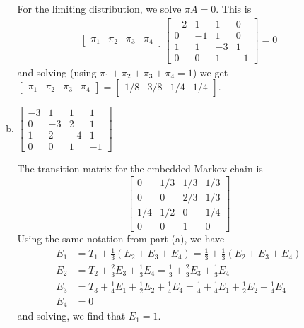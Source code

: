 \documentclass{article}
\begin{document}
\begin{itemize}
\begin{enumerate}[(a)]
\begin{soln}
					For the limiting distribution, we solve $\pi A = 0.$ This is
					\begin{align*}
						\begin{bmatrix}
							\pi_1 & \pi_2 & \pi_3 & \pi_4
						\end{bmatrix} \begin{bmatrix}
							-2 & 1 & 1 & 0 \\
							0 & -1 & 1 & 0 \\
							1 & 1 & -3 & 1 \\
							0 & 0 & 1 & -1
						\end{bmatrix} = 0
					\end{align*}
					and solving (using $\pi_1+\pi_2+\pi_3+\pi_4 = 1$) we get $\begin{bmatrix}
						\pi_1 & \pi_2 & \pi_3 & \pi_4
					\end{bmatrix} = \begin{bmatrix}
						1/8 & 3/8 & 1/4 & 1/4
					\end{bmatrix}.$
				\end{soln}

				\newpage

			\item $\begin{bmatrix}
					-3 & 1 & 1 & 1 \\
					0 & -3 & 2 & 1 \\
					1 & 2 & -4 & 1 \\
					0 & 0 & 1 & -1
				\end{bmatrix}$
				\begin{soln}
					The transition matrix for the embedded Markov chain is
					\[\begin{bmatrix}
							0 & 1/3 & 1/3 & 1/3 \\
							0 & 0 & 2/3 & 1/3 \\
							1/4 & 1/2 & 0 & 1/4 \\
							0 & 0 & 1 & 0
					\end{bmatrix}\]
					Using the same notation from part (a), we have
					\begin{align*}
						E_1 &= T_1 + \frac{1}{3}(E_2+E_3+E_4) = \frac{1}{3} + \frac{1}{3}(E_2+E_3+E_4) \\
						E_2 &= T_2 + \frac{2}{3} E_3 + \frac{1}{3} E_4 = \frac{1}{3} + \frac{2}{3} E_3 + \frac{1}{3} E_4 \\
						E_3 &= T_3 + \frac{1}{4} E_1 + \frac{1}{2}E_2 + \frac{1}{4} E_4 = \frac{1}{4} + \frac{1}{4} E_1 + \frac{1}{2} E_2 + \frac{1}{4} E_4 \\
						E_4 & = 0
					\end{align*}
					and solving, we find that $E_1=1.$


\end{soln}
\end{enumerate}
\end{itemize}
\end{document}
